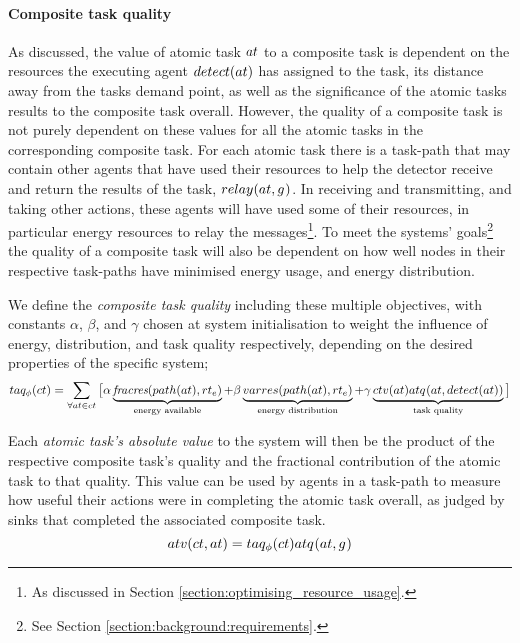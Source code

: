 \paragraph{Composite task quality}
\label{section:composite_task_quality}
As discussed, the value of atomic task $\varAtomicTask{}{}$ to a composite task is dependent on the resources the executing agent $\functionDetectorRole{}{}$ has assigned to the task, its distance away from the tasks demand point, as well as the significance of the atomic tasks results to the composite task overall. However, the quality of a composite task is not purely dependent on these values for all the atomic tasks in the corresponding composite task. For each atomic task there is a task-path that may contain other agents that have used their resources to help the detector receive and return the results of the task, $\functionRelayRole{}{}$. In receiving and transmitting, and taking other actions, these agents will have used some of their resources, in particular energy resources to relay the messages\footnote{As discussed in Section \ref{section:optimising_resource_usage}.}. To meet the systems' goals\footnote{See Section \ref{section:background:requirements}.}  the quality of a composite task will also be dependent on how well nodes in their respective task-paths have minimised energy usage, and energy distribution.  


We define the \textit{composite task quality} including these multiple objectives, with constants $\alpha$, $\beta$, and $\gamma$ chosen at system initialisation to weight the influence of energy, distribution, and task quality respectively, depending on the desired properties of the specific system; 
\begin{equation}
	\label{eq:ctv}
	\functionCompositeTaskQuality{}{} = 
	\sum\limits_{\forall \varAtomicTask{}{} \in \varCompositeTask{}{}}
	\big\lbrack
	\alpha\underbrace{\functionTaskPathEnergyAvailable{}{}}_{\text{energy available}}
	+ \beta\underbrace{\functionTaskPathEnergyVariability{\functionTaskArc{}{}}{}}_{\text{energy distribution}}
	+ 
	\gamma\underbrace{
		\functionComponentTaskValue{}{}
		\functionAtomicTaskQualitySignature{\varAtomicTask{}{}}{\functionDetectorRole{}{}}
	}_{\text{task quality}}
\big\rbrack
\end{equation}

Each \textit{atomic task's absolute value} to the system will then be the product of the respective composite task's quality and the fractional contribution of the atomic task to that quality. This value can be used by agents in a task-path to measure how useful their actions were in completing the atomic task overall, as judged by sinks that completed the associated composite task.
\begin{equation}
	\functionTaskAbsoluteValue{}{} = 
	\functionCompositeTaskQuality{}{}
	\functionAtomicTaskQualitySignature{}{}
\end{equation}

